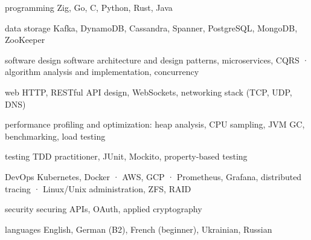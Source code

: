 

\begin{cvskills}

  \cvskill
    {programming} %
    {Zig, Go, C, Python, Rust, Java} %

  \cvskill
    {data storage} %
    {Kafka, DynamoDB, Cassandra, Spanner, PostgreSQL, MongoDB, ZooKeeper} %

  \cvskill
    {software design} %
    {software architecture and design patterns, microservices, CQRS · algorithm analysis and implementation, concurrency} %

  \cvskill
    {web} %
    {HTTP, RESTful API design, WebSockets, networking stack (TCP, UDP, DNS)} %

  \cvskill
    {performance} %
    {profiling and optimization: heap analysis, CPU sampling, JVM GC, benchmarking, load testing} %

  \cvskill
    {testing} %
    {TDD practitioner, JUnit, Mockito, property-based testing} %

  \cvskill
    {DevOps} %
    {Kubernetes, Docker · AWS, GCP · Prometheus, Grafana, distributed tracing · Linux/Unix administration, ZFS, RAID} %

  \cvskill
    {security} %
    {securing APIs, OAuth, applied cryptography} %

  \cvskill
    {languages} %
    {English, German (B2), French (beginner), Ukrainian, Russian} %

\end{cvskills}

